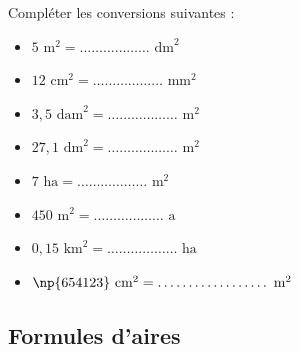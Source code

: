 \documentclass[a4paper]{book}
\begin{document}
    \begin{exemple}
        Compléter les conversions suivantes :
        
        \vspace{0.3cm}
        \begin{minipage}[t]{0.48\textwidth}
        \begin{itemize}
            \item[$\bullet$] $5 \text{ m}^2 = \dots\dots\dots\dots\dots\dots \text{ dm}^2$
            \item[$\bullet$] $12 \text{ cm}^2 = \dots\dots\dots\dots\dots\dots \text{ mm}^2$
            \item[$\bullet$] $3,5 \text{ dam}^2 = \dots\dots\dots\dots\dots\dots \text{ m}^2$
            \item[$\bullet$] $27,1 \text{ dm}^2 = \dots\dots\dots\dots\dots\dots \text{ m}^2$
        \end{itemize}
        \end{minipage}
        \hfill
        \begin{minipage}[t]{0.48\textwidth}
        \begin{itemize}
            \item[$\bullet$] $7 \text{ ha} = \dots\dots\dots\dots\dots\dots \text{ m}^2$
            \item[$\bullet$] $450 \text{ m}^2 = \dots\dots\dots\dots\dots\dots \text{ a}$
            \item[$\bullet$] $0,15 \text{ km}^2 = \dots\dots\dots\dots\dots\dots \text{ ha}$
            \item[$\bullet$] $\np{654123} \text{ cm}^2 = \dots\dots\dots\dots\dots\dots \text{ m}^2$
        \end{itemize}
        \end{minipage}
        \vspace{0.1cm}
    \end{exemple}

\subsection{Formules d'aires}
\end{document}
